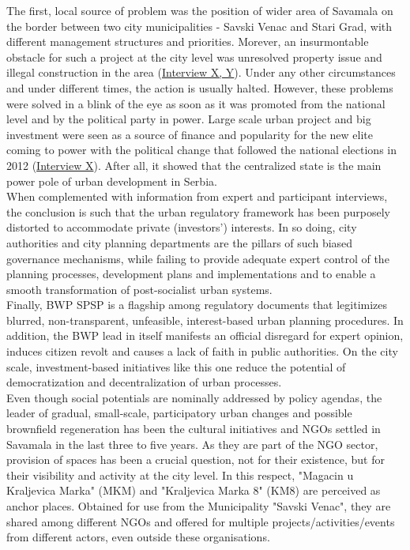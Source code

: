 \documentclass[11pt]{report}
\begin{document}
{{{{The first, local source of problem was the position of wider area of Savamala on the border between two city municipalities - Savski Venac and Stari Grad, with different management structures and priorities. Morever, an insurmontable obstacle for such a project at the city level was unresolved property issue and illegal construction in the area
(\href{InterviewX}{Interview X, Y}).
Under any other circumstances and under different times, the action is usually halted.
However, these problems were solved in a blink of the eye as soon as it was promoted from the national level and by the political party in power. 
Large scale urban project and big investment were seen as a source of finance and popularity for the new elite coming to power with the political change that followed the national elections in 2012
(\href{InterviewX}{Interview X}).
After all, it showed that the centralized state is the main power pole of urban development in Serbia.
\\

When complemented with information from expert and participant interviews, the conclusion is such that the urban regulatory framework has been purposely distorted to accommodate private (investors’) interests.
In so doing, city authorities and city planning departments are the pillars of such biased governance mechanisms, while failing to provide adequate expert control of the planning processes, development plans and implementations and to enable a smooth transformation of post-socialist urban systems.
\\

Finally, BWP SPSP is a flagship among regulatory documents that legitimizes blurred, non-transparent, unfeasible, interest-based urban planning procedures. In addition, the BWP lead in itself manifests an official disregard for expert opinion, induces citizen revolt and causes a lack of faith in public authorities. On the city scale, investment-based initiatives like this one reduce the potential of democratization and decentralization of urban processes.
\\

Even though social potentials are nominally addressed by policy agendas, the leader of gradual, small-scale, participatory urban changes and possible brownfield regeneration has been the cultural initiatives and NGOs settled in Savamala in the last three to five years. 
As they are part of the NGO sector, provision of spaces has been 
a crucial question, not for their existence, but for their visibility and activity at the city level.
In this respect, "Magacin u Kraljevica Marka" (MKM) and "Kraljevica Marka 8" (KM8) are perceived as anchor places.
Obtained for use from the Municipality "Savski Venac", they are  shared among different NGOs and offered for multiple projects/activities/events from different actors, even outside these organisations.
\\

}}}}
\end{document}
